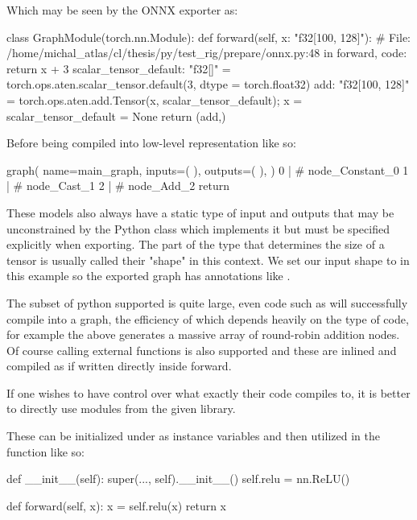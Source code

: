 Which may be seen by the ONNX exporter as:

\begtt
class GraphModule(torch.nn.Module):
    def forward(self, x: "f32[100, 128]"):
         # File: /home/michal_atlas/cl/thesis/py/test_rig/prepare/onnx.py:48 in forward, code: return x + 3
        scalar_tensor_default: "f32[]" = torch.ops.aten.scalar_tensor.default(3, dtype = torch.float32)
        add: "f32[100, 128]" = torch.ops.aten.add.Tensor(x, scalar_tensor_default);  x = scalar_tensor_default = None
        return (add,)
\endtt

Before being compiled into low-level representation like so:

\begtt
graph(
    name=main_graph,
    inputs=(
    ),
    outputs=(
    ),
) {
    0 |  # node_Constant_0
    1 |  # node_Cast_1
    2 |  # node_Add_2
    return %
}
\endtt

These models also always have a static type of input and outputs
that may be unconstrained by the Python class which implements it
but must be specified explicitly when exporting.
The part of the type that determines the size of a tensor
is usually called their "shape" in this context.
We set our input shape to  in this example
so the exported graph has annotations like .

The subset of python supported is quite large,
even code such as 
will successfully compile into a graph,
the efficiency of which depends heavily on
the type of code,
for example the above generates a massive
array of round-robin addition nodes.
Of course calling external functions is also supported
and these are inlined and compiled as if written
directly inside forward.

If one wishes to have control over what
exactly their code compiles to,
it is better to directly use modules from the given library.

These can be initialized under 
as instance variables and then utilized in
the  function like so:

\begtt {}
def __init__(self):
  super(..., self).__init__()
  self.relu = nn.ReLU()

def forward(self, x):
  x = self.relu(x)
  return x
\endtt

